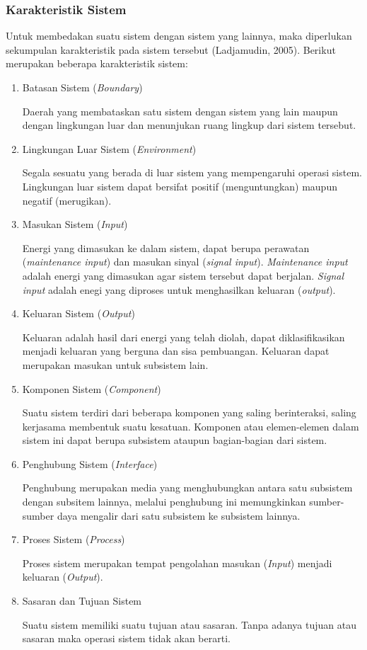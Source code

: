     \subsubsection{Karakteristik Sistem}
    Untuk membedakan suatu sistem dengan sistem yang lainnya, maka diperlukan sekumpulan karakteristik pada sistem tersebut (Ladjamudin, 2005). Berikut merupakan beberapa karakteristik sistem:
    \begin{enumerate}
        \itemsep0em
        \item Batasan Sistem (\emph{Boundary})
        
        Daerah yang membataskan satu sistem dengan sistem yang lain maupun dengan lingkungan luar dan menunjukan ruang lingkup dari sistem tersebut.
        \item Lingkungan Luar Sistem (\emph{Environment})
        
        Segala sesuatu yang berada di luar sistem yang mempengaruhi operasi sistem. Lingkungan luar sistem dapat bersifat positif (menguntungkan) maupun negatif (merugikan).
        \item Masukan Sistem (\emph{Input})
        
        Energi yang dimasukan ke dalam sistem, dapat berupa perawatan (\emph{maintenance input}) dan masukan sinyal (\emph{signal input}). \emph{Maintenance input} adalah energi yang dimasukan agar sistem tersebut dapat berjalan. \emph{Signal input} adalah enegi yang diproses untuk menghasilkan keluaran (\emph{output}).
        \item Keluaran Sistem (\emph{Output})
        
        Keluaran adalah hasil dari energi yang telah diolah, dapat diklasifikasikan menjadi keluaran yang berguna dan sisa pembuangan. Keluaran dapat merupakan masukan untuk subsistem lain.
        \item Komponen Sistem (\emph{Component})
        
        Suatu sistem terdiri dari beberapa komponen yang saling berinteraksi, saling kerjasama membentuk suatu kesatuan. Komponen atau elemen-elemen dalam sistem ini dapat berupa subsistem ataupun bagian-bagian dari sistem.
        \item Penghubung Sistem (\emph{Interface})
        
        Penghubung merupakan media yang menghubungkan antara satu subsistem dengan subsitem lainnya, melalui penghubung ini memungkinkan sumber-sumber daya mengalir dari satu subsistem ke subsistem lainnya.
        \item Proses Sistem (\emph{Process})
        
        Proses sistem merupakan tempat pengolahan masukan (\emph{Input}) menjadi keluaran (\emph{Output}).
        \item Sasaran dan Tujuan Sistem
        
        Suatu sistem memiliki suatu tujuan atau sasaran. Tanpa adanya tujuan atau sasaran maka operasi sistem tidak akan berarti.
    \end{enumerate}
    
